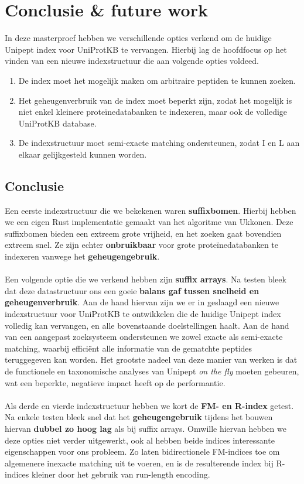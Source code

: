 \chapter{Conclusie \& future work}\label{ch:conclusie}
In deze masterproef hebben we verschillende opties verkend om de huidige Unipept index voor UniProtKB te vervangen.
Hierbij lag de hoofdfocus op het vinden van een nieuwe indexstructuur die aan volgende opties voldeed.
\begin{enumerate}
    \item De index moet het mogelijk maken om arbitraire peptiden te kunnen zoeken.
    \item Het geheugenverbruik van de index moet beperkt zijn, zodat het mogelijk is niet enkel kleinere proteïnedatabanken te indexeren, maar ook de volledige UniProtKB database\@.
    \item De indexstructuur moet semi-exacte matching ondersteunen, zodat I en L aan elkaar gelijkgesteld kunnen worden.
\end{enumerate}

\section{Conclusie}
Een eerste indexstructuur die we bekekenen waren \textbf{suffixbomen}.
Hierbij hebben we een eigen Rust implementatie gemaakt van het algoritme van Ukkonen.
Deze suffixbomen bieden een extreem grote vrijheid, en het zoeken gaat bovendien extreem snel.
Ze zijn echter \textbf{onbruikbaar} voor grote proteïnedatabanken te indexeren vanwege het \textbf{geheugengebruik}.
\\ \\
Een volgende optie die we verkend hebben zijn \textbf{suffix arrays}.
Na testen bleek dat deze datastructuur ons een goeie \textbf{balans gaf tussen snelheid en geheugenverbruik}.
Aan de hand hiervan zijn we er in geslaagd een nieuwe indexstructuur voor UniProtKB te ontwikkelen die de huidige Unipept index volledig kan vervangen, en alle bovenstaande doelstellingen haalt.
Aan de hand van een aangepast zoeksysteem ondersteunen we zowel exacte als semi-exacte matching, waarbij efficiënt alle informatie van de gematchte peptides teruggegeven kan worden.
Het grootste nadeel van deze manier van werken is dat de functionele en taxonomische analyses van Unipept \textit{on the fly} moeten gebeuren, wat een beperkte, negatieve impact heeft op de performantie.
\\ \\
Als derde en vierde indexstructuur hebben we kort de \textbf{FM- en R-index} getest.
Na enkele testen bleek snel dat het \textbf{geheugengebruik} tijdens het bouwen hiervan \textbf{dubbel zo hoog lag} als bij suffix arrays.
Omwille hiervan hebben we deze opties niet verder uitgewerkt, ook al hebben beide indices interessante eigenschappen voor ons probleem.
Zo laten bidirectionele FM-indices toe om algemenere inexacte matching uit te voeren, en is de resulterende index bij R-indices kleiner door het gebruik van run-length encoding.


